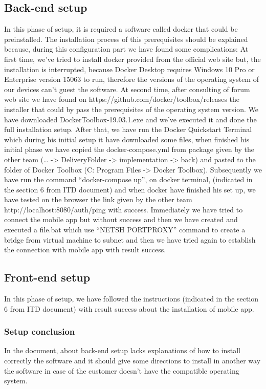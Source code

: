 \subsection{Back-end setup}
In this phase of setup, it is required a software called docker that could be preinstalled. The installation process of this prerequisites should be explained because, during this configuration part we have found some complications: 
At first time, we’ve tried to install docker provided from the official web site but, the installation is interrupted, because Docker Desktop requires Windows 10 Pro or Enterprise version 15063 to run, therefore the versions of the operating system of our devices can’t guest the software. At second time, after consulting of forum web site we have found on https://github.com/docker/toolbox/releases the installer that could by pass the prerequisites of the operating system version. We have downloaded DockerToolbox-19.03.1.exe and we’ve executed it and done the full installation setup. After that, we have run the Docker Quickstart Terminal which during his initial setup it have downloaded some files, when finished his initial phase we have copied the docker-compose.yml from package given by the other team (… -> DeliveryFolder -> implementation -> back) and pasted to the folder of Docker Toolbox (C: Program Files -> Docker Toolbox). Subsequently  we have run the command “docker-compose up”, on docker terminal, (indicated in the section 6 from ITD document) and when docker have finished his set up, we have tested on the browser the link given by the other team http://localhost:8080/auth/ping with success.  Immediately we have tried to connect the mobile app but without success and then we have created and executed a file.bat which use “NETSH PORTPROXY” command to create a bridge from virtual machine to subnet and then we have tried again to establish the connection with mobile app with result success.

\subsection{Front-end setup}
In this phase of setup, we have followed the instructions (indicated in the section 6 from ITD document) with result success about the installation of mobile app.
\subsubsection{Setup conclusion}
In the document, about back-end setup lacks explanations of how to install correctly the software and it should give some directions to install in another way the software in case of the customer doesn’t have the compatible operating system. 









